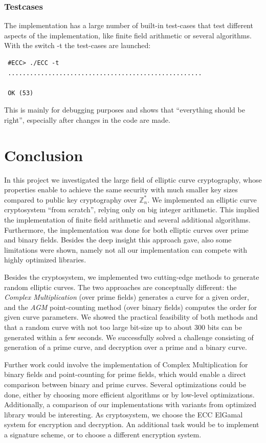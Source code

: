 \documentclass[11pt,english]{article}
\begin{document}
\subsubsection{Testcases}
The implementation has a large number of built-in test-cases that test different aspects of the implementation, like finite field arithmetic or several algorithms. With the switch -t the test-cases are launched:
\begin{verbatim}
 #ECC> ./ECC -t
 .....................................................

 OK (53)
\end{verbatim}
This is mainly for debugging purposes and shows that ``everything should be right'', especially after changes in the code are made.

\section{Conclusion}
In this project we investigated the large field of elliptic curve cryptography, whose properties enable to achieve the same security with much smaller key sizes compared to public key cryptography over $\mathbb{Z}_n^*$. We implemented an elliptic curve cryptosystem ``from scratch'', relying only on big integer arithmetic. This implied the implementation of finite field arithmetic and several additional algorithms. Furthermore, the implementation was done for both elliptic curves over prime and binary fields. Besides the deep insight this approach gave, also some limitations were shown, namely not all our implementation can compete with highly optimized libraries.

Besides the cryptosystem, we implemented two cutting-edge methods to generate random elliptic curves. The two approaches are conceptually different: the \emph{Complex Multiplication} (over prime fields) generates a curve for a given order, and the \emph{AGM} point-counting method (over binary fields) computes the order for given curve parameters. We showed the practical feasibility of both methods and that a random curve with not too large bit-size up to about 300 bits can be generated within a few seconds. We successfully solved a challenge consisting of generation of a prime curve, and decryption over a prime and a binary curve. 

Further work could involve the implementation of Complex Multiplication for binary fields and point-counting for prime fields, which would enable a direct comparison between binary and prime curves. Several optimizations could be done, either by choosing more efficient algorithms or by low-level optimizations. Additionally, a comparison of our implementations with variants from optimized library would be interesting. As cryptosystem, we choose the ECC ElGamal system for encryption and decryption. An additional task would be to implement a signature scheme, or to choose a different encryption system.
\end{document}
